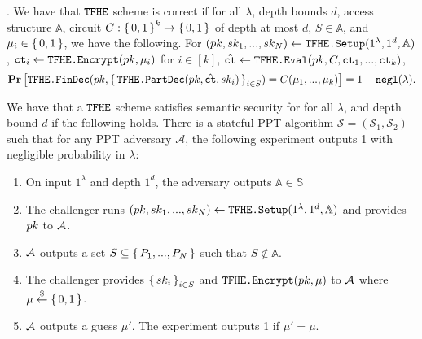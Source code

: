 \begin{definition}.
	We have that ${\texttt{TFHE}}$ scheme is correct if
	for all $\lambda$, depth bounds $d$, access structure $\mathbb{A}$, circuit $C : \set{0, 1}^k \rightarrow \set{0, 1}$
	of depth at most $d$, $S \in \mathbb{A}$, and $\mu_i \in \set{0, 1}$, we have the following.
	For $(pk, sk_1, ..., sk_N) \gets \texttt{TFHE.Setup}(1^\lambda, 1^d, \mathbb{A})$,
	$\texttt{ct}_i \gets \texttt{TFHE.Encrypt}(pk, \mu_i)$ for $i \in [k]$, $\hat{\texttt{ct}} \gets \texttt{TFHE.Eval}(pk, C, \texttt{ct}_1, ..., \texttt{ct}_k)$,
	\begin{equation*}
		\operatorname*{\mathbf{Pr}}\left[\texttt{TFHE.FinDec}(pk,
			\set{\texttt{TFHE.PartDec}(pk, \hat{\texttt{ct}}, sk_i)}_{i \in S}) = C(\mu_1, ..., \mu_k)\right] = 1 - \texttt{negl}(\lambda).
	\end{equation*}
\end{definition}

\begin{definition}
	\label{def:semanticSecurityTFHE}
	We have that a ${\texttt{TFHE}}$ scheme satisfies semantic security for for all $\lambda$, and depth bound $d$ if the following holds. There is a stateful PPT algorithm
	$\mathcal{S} = (\mathcal{S}_1, \mathcal{S}_2)$ such that for any PPT adversary $\mathcal{A}$,
	the following experiment outputs 1 with negligible probability in $\lambda$:
	\begin{enumerate}
		\item On input $1^\lambda$ and depth $1^d$, the adversary outputs $\mathbb{A} \in \mathbb{S}$
		\item The challenger runs $(pk, sk_1, ..., sk_N) \gets \texttt{TFHE.Setup}(1^\lambda, 1^d, \mathbb{A})$ and provides $pk$ to $\mathcal{A}$.
		\item $\mathcal{A}$ outputs a set $S \subseteq \set{P_1, ..., P_N}$ such that $S \notin \mathbb{A}$.
		\item The challenger provides $\set{sk_i}_{i \in S}$ and $\texttt{TFHE.Encrypt}(pk, \mu)$ to $\mathcal{A}$ where $\mu \overset{\$}{\gets} \set{0, 1}$.
		\item $\mathcal{A}$ outputs a guess $\mu'$. The experiment outputs 1 if $\mu' = \mu$.
	\end{enumerate}
\end{definition}

